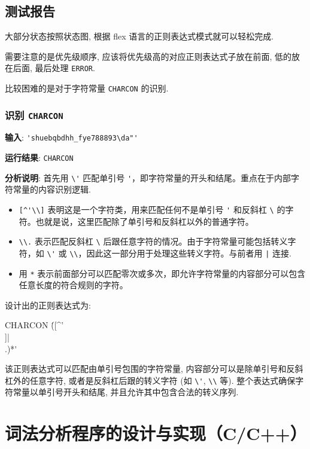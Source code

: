 \subsection{测试报告}

大部分状态按照状态图, 根据 flex 语言的正则表达式模式就可以轻松完成.

需要注意的是优先级顺序, 应该将优先级高的对应正则表达式子放在前面, 低的放在后面, 最后处理 \texttt{ERROR}.

比较困难的是对于字符常量 \texttt{CHARCON} 的识别.

\subsubsection{识别 \texttt{CHARCON}}

\textbf{输入}: \verb|'shuebqbdhh_fye788893\da"'|

\textbf{运行结果}: \texttt{CHARCON}

\textbf{分析说明}: 首先用 \verb|\'| 匹配单引号 \verb|'|，即字符常量的开头和结尾。重点在于内部字符常量的内容识别逻辑. \begin{itemize}
    \item \verb|[^'\\]| 表明这是一个字符类，用来匹配任何不是单引号 \verb|'| 和反斜杠 \verb|\| 的字符。也就是说，这里匹配除了单引号和反斜杠以外的普通字符。
    \item \verb|\\.| 表示匹配反斜杠 \verb|\| 后跟任意字符的情况。由于字符常量可能包括转义字符，如 \verb|\'| 或 \verb|\\|，因此这一部分用于处理这些转义字符。与前者用 \texttt{|} 连接.
    \item 用 \verb|*| 表示前面部分可以匹配零次或多次，即允许字符常量的内容部分可以包含任意长度的符合规则的字符。
\end{itemize}

设计出的正则表达式为: \begin{cppcode}
CHARCON         \'([^'\\]|\\.)*\'
\end{cppcode}

该正则表达式可以匹配由单引号包围的字符常量, 内容部分可以是除单引号和反斜杠外的任意字符, 或者是反斜杠后跟的转义字符 (如 \verb|\'|, \verb|\\| 等). 整个表达式确保字符常量以单引号开头和结尾, 并且允许其中包含合法的转义序列.

\section{词法分析程序的设计与实现（C/C++）}

